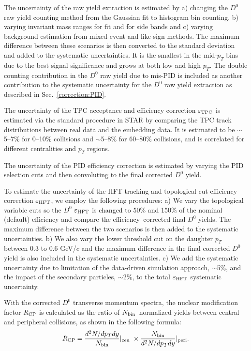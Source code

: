 \documentclass[%
 reprint,	
 amsmath,amssymb,
 aps,
 prc,
]{revtex4-1}
\begin{document}
The uncertainty of the raw yield extraction is estimated by a) changing the $D^0$ raw yield counting method from the Gaussian fit to histogram bin counting. b) varying invariant mass ranges for fit and for side bands and c) varying background estimation from mixed-event and like-sign methods. The maximum difference between these scenarios is then converted to the standard deviation and added to the systematic uncertainties. It is the smallest in the mid-$p_{T}$ bins due to the best signal significance and grows at both low and high $p_{T}$. The double counting contribution in the $D^0$ raw yield  due to mis-PID is included as another contribution to the systematic uncertainty for the $D^0$ raw yield extraction as described in Sec.~\ref{correction:PID}.

The uncertainty of the TPC acceptance and efficiency correction $\varepsilon_{\rm TPC}$ is estimated via the standard procedure in STAR by comparing the TPC track distributions between real data and the embedding data. It is estimated to be $\sim$5--7\% for 0--10\% collisions and $\sim$5--8\% for 60--80\% collisions, and is correlated for different centralities and $p_{T}$ regions. 

The uncertainty of the PID efficiency correction is estimated by varying the PID selection cuts and then convoluting to the final corrected $D^0$ yield. 


To estimate the uncertainty of the HFT tracking and topological cut efficiency correction $\varepsilon_{\rm HFT}$, we employ the following procedures: a) We vary the topological variable cuts so the $D^0$ $\varepsilon_{\rm HFT}$ is changed to 50\% and 150\% of the nominal (default) efficiency and compare the efficiency--corrected final $D^0$ yields. The maximum difference between the two scenarios is then added to the systematic uncertainties. b) We also vary the lower threshold cut on the daughter $p_{T}$ between 0.3 to 0.6 GeV/$c$ and the maximum difference in the final corrected $D^0$ yield is also included in the systematic uncertainties. c) We add the systematic uncertainty due to limitation of the data-driven simulation approach, $\sim$5\%, and the impact of the secondary particles, $\sim$2\%, to the total $\varepsilon_{\rm HFT}$ systematic uncertainty.

With the corrected $D^0$ transverse momentum spectra, the nuclear modification factor $R_{\rm CP}$ is calculated as the ratio of $N_{\rm bin}$--normalized yields between central and peripheral collisions, as shown in the following formula:
\begin{equation}
  R_{\rm CP} = \frac{d^2N/dp_{T}dy}{N_{\rm bin}} |_{\rm cen\ } \times \frac{N_{\rm bin}} {d^2N/dp_{T}dy} |_{\rm peri }.
\label{equ:equation3}
\end{equation}
\end{document}
